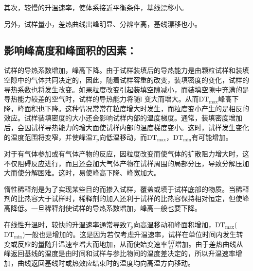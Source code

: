\documentclass[a4paper]{article}
\begin{document}
其次，较慢的升温速率，使体系接近平衡条件，基线漂移小。

另外，试样量小，差热曲线出峰明显、分辨率高，基线漂移也小。
\subsection*{影响峰高度和峰面积的因素：}
试样的导热系数增加，峰高下降。由于试样装填后的导热能力是由颗粒试样和装填空隙中的气体共同决定的，因此，随着试样容重的改变，装填密度的变化，试样的导热系数也将发生改变。如果粒度改变引起装填空隙减小，而装填空隙中充满的是导热能力较差的空气时，试样的导热能力将随l 变大而增大。从而$\text{DT}_{\text{max}}$峰高下降，峰面积也下降。这种情况常常在粒度增大时发生，而粒度变小产生的是相反的效应。试样装填密度的大小还会影响试样内部的温度梯度。通常，装填密度增加后，会因试样导热能力的增大面使试样内部的温度梯度变小。这时，试样发生变化的温度范围将变窄，并使峰温$T_p$向低温移动，而$\text{DT}_{\text{max}}$，$\text{DT}_{\text{min}}$有可能增加。

对于有气体参加或有气体产物的反应，因粒度改变而使气体的扩散阻力增大时，这不仅阻碍反应进行，而且还会加大气体产物在试样周围的局部分压，导致分解压加大而使分解困难。这时，易使峰高下降、峰宽加大。

惰性稀释剂是为了实现某些目的而掺入试样，覆盖或填于试样底部的物质。当稀释剂的比热容大于试样时，稀释剂的加入还利于试样的比热容保持相对恒定，但使峰高降低。一旦稀释剂使试样的导热系数增加，峰高一般也要下降。

在线性升温时，较快的升温速率通常导致$T_p$向高温移动和峰面积增加，$\text{DT}_{\text{max}}$($\text{DT}_{\text{min}}$)一般也是增加的。这是因为若仅考虑升温速率，试样在单位时间内发生转变或反应的量随升温速率增大而地加，从而使始变速率$\frac{\text{d}H}{\text{d}t}$增加。由于差热曲线从峰返回基线的温度是由时间和试样与参比物间的温度差决定的，所以升温速率增加，曲线返回基线时或热效应结束时的温度均向高温方向移动。
\fi
\end{document}

